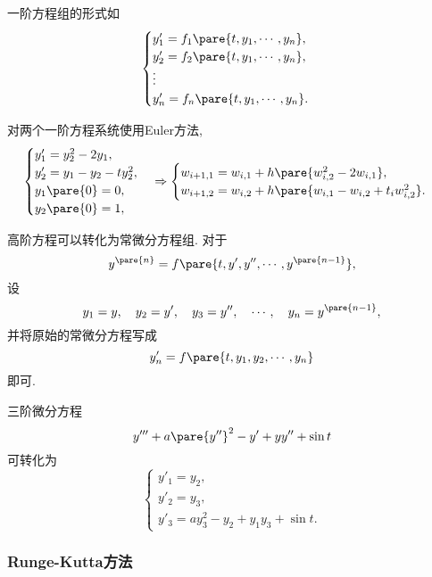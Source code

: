 \documentclass{ctexart}
\begin{document}
一阶方程组的形式如
\[ \begin{cases}
    y'_1 = f_1\pare{t,y_1,\cdots,y_n}, \\
    y'_2 = f_2\pare{t,y_1,\cdots,y_n}, \\
    \vdots \\
    y'_n = f_n\pare{t,y_1,\cdots,y_n}.
\end{cases} \]
\begin{ex}
    对两个一阶方程系统使用Euler方法,
    \[ \begin{cases}
        y'_1 = y_2^2 - 2y_1, \\
        y'_2 = y_1 - y_2 - ty_2^2, \\
        y_1\pare{0} = 0,\\
        y_2\pare{0} = 1,
    \end{cases} \Rightarrow \begin{cases}
        w_{i+1,1} = w_{i,1} + h\pare{w_{i,2}^2 - 2w_{i,1}}, \\
        w_{i+1,2} = w_{i,2} + h\pare{w_{i,1} - w_{i,2} + t_i w_{i,2}^2}.
    \end{cases} \]
\end{ex}
高阶方程可以转化为常微分方程组. 对于
\[ y^{\pare{n}} = f\pare{t,y',y'',\cdots,y^{\pare{n-1}}}, \]
设
\[ y_1 = y,\quad y_2 = y',\quad y_3 = y'',\quad \cdots,\quad y_n = y^{\pare{n-1}}, \]
并将原始的常微分方程写成
\[ y'_n = f\pare{t,y_1,y_2,\cdots,y_n} \]
即可.
\begin{ex}
    三阶微分方程
    \[ y''' + a\pare{y''}^2 - y' + yy'' + \sin t \]
    可转化为
    \[ \begin{cases}
        y'_1 = y_2, \\
        y'_2 = y_3, \\
        y'_3 = ay_3^2 - y_2 + y_1y_3 + \sin t.
    \end{cases} \]
\end{ex}


\subsubsection{Runge-Kutta方法} %
\label{ssub:runge_kutta方法}
\end{document}
